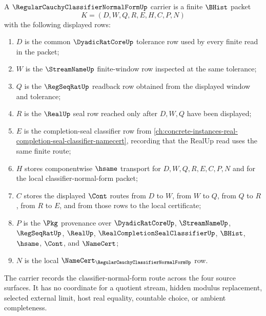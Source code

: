 \begin{definition}
\label{def:regular-cauchy-classifier-normal-form-carrier}
A $\RegularCauchyClassifierNormalFormUp$ carrier is a finite $\BHist$ packet
$$
K=(D,W,Q,R,E,H,C,P,N)
$$
with the following displayed rows:
\begin{enumerate}
\item $D$ is the common $\DyadicRatCoreUp$ tolerance row used by every finite read in the packet;
\item $W$ is the $\StreamNameUp$ finite-window row inspected at the same tolerance;
\item $Q$ is the $\RegSeqRatUp$ readback row obtained from the displayed window and tolerance;
\item $R$ is the $\RealUp$ seal row reached only after $D,W,Q$ have been displayed;
\item $E$ is the completion-seal classifier row from \autoref{ch:concrete-instances-real-completion-seal-classifier-namecert}, recording that the RealUp read uses the same finite route;
\item $H$ stores componentwise $\hsame$ transport for $D,W,Q,R,E,C,P,N$ and for the local classifier-normal-form packet;
\item $C$ stores the displayed $\Cont$ routes from $D$ to $W$, from $W$ to $Q$, from $Q$ to $R$, from $R$ to $E$, and from those rows to the local certificate;
\item $P$ is the $\Pkg$ provenance over $\DyadicRatCoreUp$, $\StreamNameUp$, $\RegSeqRatUp$, $\RealUp$, $\RealCompletionSealClassifierUp$, $\BHist$, $\hsame$, $\Cont$, and $\NameCert$;
\item $N$ is the local $\NameCert_{\RegularCauchyClassifierNormalFormUp}$ row.
\end{enumerate}
The carrier records the classifier-normal-form route across the four source surfaces. It has no coordinate for a quotient stream, hidden modulus replacement, selected external limit, host real equality, countable choice, or ambient completeness.
\end{definition}

